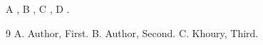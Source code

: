 \documentclass{article}
\begin{document}
A \cite{a}, B \cite{a,b}, C \cite[Section 7]{a}, D \cite{kho}.
\begin{thebibliography}{9}
 A. Author, First.
 B. Author, Second.
 C. Khoury, Third.
\end{thebibliography}
\end{document}
